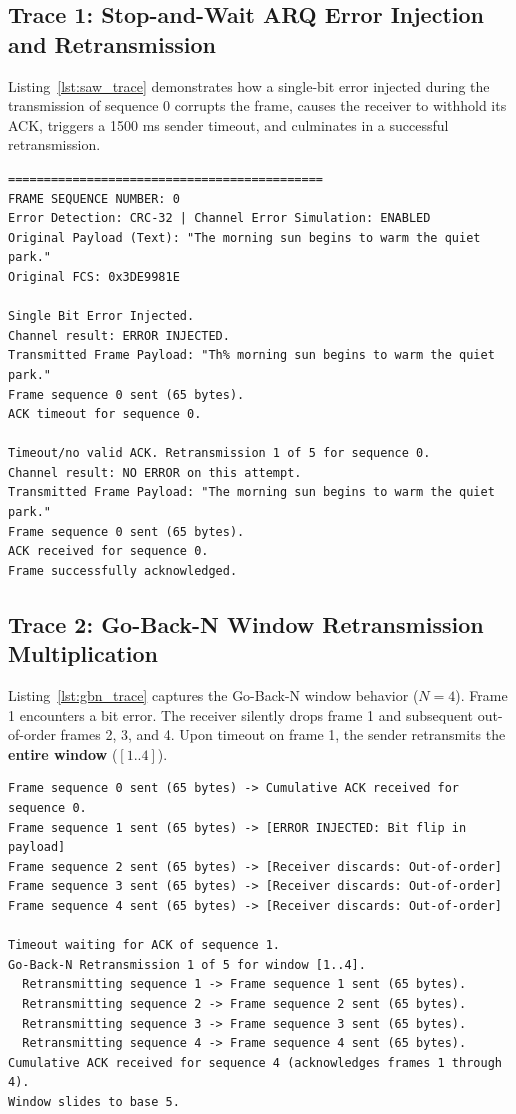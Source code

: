 \documentclass[11pt,a4paper]{article}
\begin{document}
\subsection{Trace 1: Stop-and-Wait ARQ Error Injection and Retransmission}

Listing~\ref{lst:saw_trace} demonstrates how a single-bit error injected during the transmission of sequence 0 corrupts the frame, causes the receiver to withhold its ACK, triggers a 1500 ms sender timeout, and culminates in a successful retransmission.

\begin{lstlisting}[style=hexstyle, caption={Live socket execution trace: Stop-and-Wait ARQ error recovery.}, label={lst:saw_trace}]
============================================
FRAME SEQUENCE NUMBER: 0
Error Detection: CRC-32 | Channel Error Simulation: ENABLED
Original Payload (Text): "The morning sun begins to warm the quiet park."
Original FCS: 0x3DE9981E

Single Bit Error Injected.
Channel result: ERROR INJECTED.
Transmitted Frame Payload: "Th% morning sun begins to warm the quiet park."
Frame sequence 0 sent (65 bytes).
ACK timeout for sequence 0.

Timeout/no valid ACK. Retransmission 1 of 5 for sequence 0.
Channel result: NO ERROR on this attempt.
Transmitted Frame Payload: "The morning sun begins to warm the quiet park."
Frame sequence 0 sent (65 bytes).
ACK received for sequence 0.
Frame successfully acknowledged.
\end{lstlisting}

\subsection{Trace 2: Go-Back-N Window Retransmission Multiplication}

Listing~\ref{lst:gbn_trace} captures the Go-Back-N window behavior (\(N=4\)). Frame 1 encounters a bit error. The receiver silently drops frame 1 and subsequent out-of-order frames 2, 3, and 4. Upon timeout on frame 1, the sender retransmits the \textbf{entire window} (\([1..4]\)).

\begin{lstlisting}[style=hexstyle, caption={Live socket execution trace: Go-Back-N ARQ full-window retransmission.}, label={lst:gbn_trace}]
Frame sequence 0 sent (65 bytes) -> Cumulative ACK received for sequence 0.
Frame sequence 1 sent (65 bytes) -> [ERROR INJECTED: Bit flip in payload]
Frame sequence 2 sent (65 bytes) -> [Receiver discards: Out-of-order]
Frame sequence 3 sent (65 bytes) -> [Receiver discards: Out-of-order]
Frame sequence 4 sent (65 bytes) -> [Receiver discards: Out-of-order]

Timeout waiting for ACK of sequence 1.
Go-Back-N Retransmission 1 of 5 for window [1..4].
  Retransmitting sequence 1 -> Frame sequence 1 sent (65 bytes).
  Retransmitting sequence 2 -> Frame sequence 2 sent (65 bytes).
  Retransmitting sequence 3 -> Frame sequence 3 sent (65 bytes).
  Retransmitting sequence 4 -> Frame sequence 4 sent (65 bytes).
Cumulative ACK received for sequence 4 (acknowledges frames 1 through 4).
Window slides to base 5.
\end{lstlisting}
\end{document}
